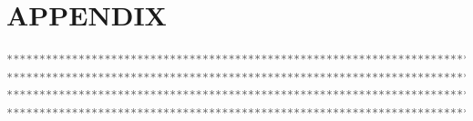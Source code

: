 \documentclass[a4paper, 10pt]{IEEEconf}
\begin{document}

\nocite{*}




\clearpage
\onecolumn

\section*{APPENDIX}

\begin{lstlisting}[language = C++]
*******************************************************************************
*******************************************************************************
*******************************************************************************
***********************************************************************
\end{lstlisting}
\end{document}
